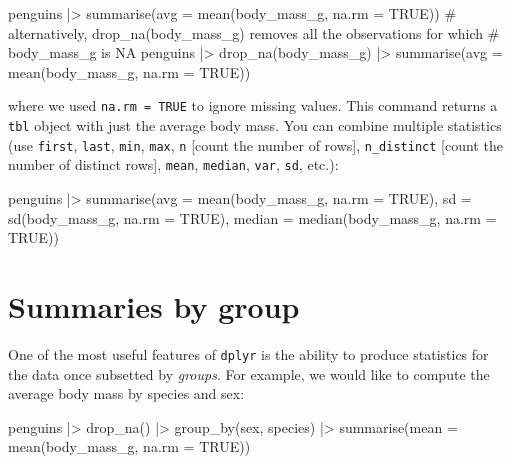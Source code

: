 \documentclass[
  letterpaper,
  DIV=11,
  numbers=noendperiod]{scrreprt}
\newenvironment{Shaded}{\begin{snugshade}}{\end{snugshade}}
\newcommand{\NormalTok}[1]{\textcolor[rgb]{0.00,0.23,0.31}{#1}}
\begin{document}
\begin{Shaded}
\begin{Highlighting}[]
\NormalTok{penguins |\textgreater{} }
\NormalTok{  summarise(avg = mean(body\_mass\_g, na.rm = TRUE))}
\NormalTok{\# alternatively, drop\_na(body\_mass\_g) removes all the observations for which}
\NormalTok{\# body\_mass\_g is NA}
\NormalTok{penguins |\textgreater{} }
\NormalTok{  drop\_na(body\_mass\_g) |\textgreater{} }
\NormalTok{  summarise(avg = mean(body\_mass\_g, na.rm = TRUE))}
\end{Highlighting}
\end{Shaded}

where we used \texttt{na.rm\ =\ TRUE} to ignore missing values. This
command returns a \texttt{tbl} object with just the average body mass.
You can combine multiple statistics (use \texttt{first}, \texttt{last},
\texttt{min}, \texttt{max}, \texttt{n} {[}count the number of rows{]},
\texttt{n\_distinct} {[}count the number of distinct rows{]},
\texttt{mean}, \texttt{median}, \texttt{var}, \texttt{sd}, etc.):

\begin{Shaded}
\begin{Highlighting}[]
\NormalTok{penguins |\textgreater{} }
\NormalTok{  summarise(avg = mean(body\_mass\_g, na.rm = TRUE), }
\NormalTok{            sd = sd(body\_mass\_g, na.rm = TRUE), }
\NormalTok{            median = median(body\_mass\_g, na.rm = TRUE))}
\end{Highlighting}
\end{Shaded}

\section{Summaries by group}\label{summaries-by-group}

One of the most useful features of \texttt{dplyr} is the ability to
produce statistics for the data once subsetted by \emph{groups}. For
example, we would like to compute the average body mass by species and
sex:

\begin{Shaded}
\begin{Highlighting}[]
\NormalTok{penguins |\textgreater{} }
\NormalTok{  drop\_na() |\textgreater{} }
\NormalTok{  group\_by(sex, species) |\textgreater{} }
\NormalTok{  summarise(mean = mean(body\_mass\_g, na.rm = TRUE))}
\end{Highlighting}
\end{Shaded}
\end{document}
